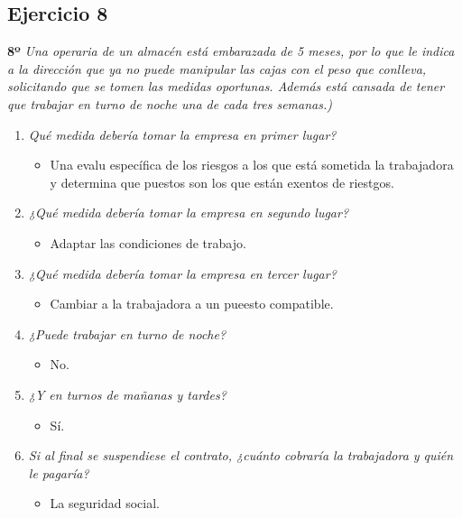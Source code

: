 \documentclass{article}
\begin{document}
        \subsection{Ejercicio 8}
        \textbf{8º} \textit{Una operaria de un almacén está embarazada de 5 meses, por lo que le indica a la dirección que ya no puede manipular las cajas con el peso que conlleva, solicitando que se tomen las medidas 
        oportunas. Además está cansada de tener que trabajar en turno de noche una de cada tres semanas.)}
        \\
        \begin{enumerate}[label=(\alph*)]
          \item \textit{Qué medida debería tomar la empresa en primer lugar?}
            \begin{itemize}
              \item Una evalu específica de los riesgos a los que está sometida la trabajadora y determina que puestos son los que están exentos de riestgos.
            \end{itemize}
          \item \textit{¿Qué medida debería tomar la empresa en segundo lugar?}
            \begin{itemize}
              \item Adaptar las condiciones de trabajo.
            \end{itemize}
          \item \textit{¿Qué medida debería tomar la empresa en tercer lugar?}
            \begin{itemize}
              \item Cambiar a la trabajadora a un pueesto compatible.
            \end{itemize}
          \item \textit{¿Puede trabajar en turno de noche?}
            \begin{itemize}
              \item No.
            \end{itemize}
          \item \textit{¿Y en turnos de mañanas y tardes?}
            \begin{itemize}
              \item Sí.
            \end{itemize}
          \item \textit{Si al final se suspendiese el contrato, ¿cuánto cobraría la trabajadora y quién le pagaría?}
            \begin{itemize}
              \item La seguridad social.
            \end{itemize}
        \end{enumerate}
      
\end{document}
